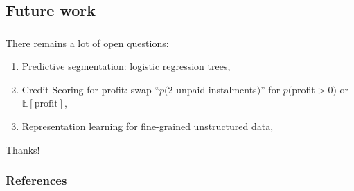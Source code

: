 \documentclass[english,xcolor={rgb,dvipsnames,table,usenames}]{beamer}
\begin{document}
\subsection{Future work}

\begin{frame}
\frametitle{\subsecname}

There remains a lot of open questions:
\begin{enumerate}
\item Predictive segmentation: logistic regression trees,

\medskip

\item<3-> Credit Scoring for profit: swap ``$p($2 unpaid instalments$)$'' for $p($profit$>0)$ or $\mathbb{E}[\text{profit}]$,

\medskip

\item<5-> Representation learning for fine-grained unstructured data,

\medskip

\end{enumerate}

\end{frame}



\begin{frame}

\Huge

Thanks!

\end{frame}


\begin{frame}[allowframebreaks]
\frametitle{References}
\begin{scriptsize}
\printbibliography
\end{scriptsize}
\end{frame}
\end{document}
